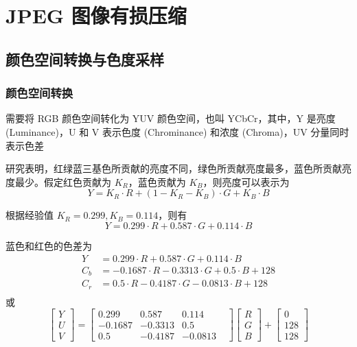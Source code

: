 \chapter{JPEG 图像有损压缩}
\section{颜色空间转换与色度采样}
\subsection{颜色空间转换}

需要将 RGB 颜色空间转化为 YUV 颜色空间，也叫 YCbCr，其中，Y 是亮度 (Luminance)，U 和 V 表示色度 (Chrominance) 和浓度 (Chroma)，UV 分量同时表示色差

研究表明，红绿蓝三基色所贡献的亮度不同，绿色所贡献亮度最多，蓝色所贡献亮度最少。假定红色贡献为 $K_R$，蓝色贡献为 $K_B$，则亮度可以表示为
\begin{equation}
    Y = K_R \cdot R + (1-K_R-K_B) \cdot G + K_B \cdot B
\end{equation}

根据经验值 $K_R=0.299, K_B=0.114$，则有
\begin{equation}
    Y = 0.299 \cdot R + 0.587 \cdot G + 0.114 \cdot B
\end{equation}

蓝色和红色的色差为
\begin{equation}
    \begin{aligned}
        Y   &= 0.299   \cdot R + 0.587    \cdot G + 0.114 \cdot B \\
        C_b &= -0.1687 \cdot R - 0.3313   \cdot G + 0.5 \cdot B +128\\
        C_r &= 0.5   \cdot R - 0.4187   \cdot G - 0.0813 \cdot B +128\\
    \end{aligned}    
\end{equation}
或
\begin{equation}
    \begin{bmatrix}
        Y \\ U \\ V
    \end{bmatrix}
    =\begin{bmatrix}
        0.299   & 0.587    & 0.114 & \\
        -0.1687 & -0.3313   & 0.5 & \\
        0.5     & -0.4187   & -0.0813 &
    \end{bmatrix}
    \begin{bmatrix}
        R \\ G \\ B
    \end{bmatrix}
    +\begin{bmatrix}
        0 \\ 128 \\ 128
    \end{bmatrix}
\end{equation}


